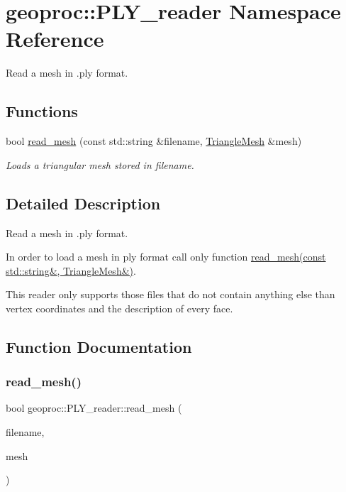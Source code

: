 \hypertarget{namespacegeoproc_1_1PLY__reader}{}\section{geoproc\+:\+:P\+L\+Y\+\_\+reader Namespace Reference}
\label{namespacegeoproc_1_1PLY__reader}


Read a mesh in .ply format.  


\subsection*{Functions}
\begin{DoxyCompactItemize}
\item 
bool \hyperlink{namespacegeoproc_1_1PLY__reader_a7b13df3c66f0cf33b5ae96ad3302d2e2}{read\+\_\+mesh} (const std\+::string \&filename, \hyperlink{classgeoproc_1_1TriangleMesh}{Triangle\+Mesh} \&mesh)
\begin{DoxyCompactList}\small\item\em Loads a triangular mesh stored in {\itshape filename}. \end{DoxyCompactList}\end{DoxyCompactItemize}


\subsection{Detailed Description}
Read a mesh in .ply format. 

In order to load a mesh in ply format call only function \hyperlink{namespacegeoproc_1_1PLY__reader_a7b13df3c66f0cf33b5ae96ad3302d2e2}{read\+\_\+mesh(const std\+::string\&, Triangle\+Mesh\&)}.

This reader only supports those files that do not contain anything else than vertex coordinates and the description of every face. 

\subsection{Function Documentation}
\mbox{\label{namespacegeoproc_1_1PLY__reader_a7b13df3c66f0cf33b5ae96ad3302d2e2}} 
\subsubsection{\texorpdfstring{read\+\_\+mesh()}{read\_mesh()}}
{\footnotesize\ttfamily bool geoproc\+::\+P\+L\+Y\+\_\+reader\+::read\+\_\+mesh (\begin{DoxyParamCaption}\item[{const std\+::string \&}]{filename,  }\item[{\hyperlink{classgeoproc_1_1TriangleMesh}{Triangle\+Mesh} \&}]{mesh }\end{DoxyParamCaption})}



